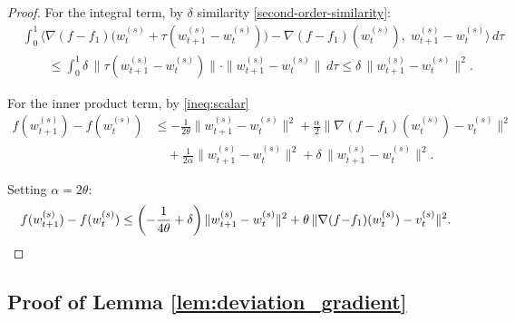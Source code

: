 \documentclass{article}
\begin{document}
\begin{proof}
For the integral term, by $\delta$ similarity \ref{second-order-similarity}:
\begin{align*}
&\int_0^1 \langle \nabla(f{-}f_1)\bigl(w_t^{(s)} 
  + \tau(w_{t+1}^{(s)} - w_t^{(s)})\bigr) 
  - \nabla(f{-}f_1)(w_t^{(s)}),\; 
  w_{t+1}^{(s)} - w_t^{(s)} \rangle \, d\tau \\
&\qquad \leq \int_0^1 \delta\,\|\tau(w_{t+1}^{(s)} - w_t^{(s)})\| 
  \cdot \|w_{t+1}^{(s)} - w_t^{(s)}\| \, d\tau 
\leq \delta\,\|w_{t+1}^{(s)} - w_t^{(s)}\|^2.
\end{align*}

For the inner product term, by \ref{ineq:scalar} 
\begin{align*}
f(w_{t+1}^{(s)}) - f(w_t^{(s)}) 
&\leq -\frac{1}{2\theta}\|w_{t+1}^{(s)} - w_t^{(s)}\|^2 
  + \frac{\alpha}{2}\|\nabla(f{-}f_1)(w_t^{(s)}) - v_t^{(s)}\|^2 \\
&\quad + \frac{1}{2\alpha}\|w_{t+1}^{(s)} - w_t^{(s)}\|^2 
  + \delta\,\|w_{t+1}^{(s)} - w_t^{(s)}\|^2.
\end{align*}

Setting $\alpha = 2\theta$:
\[
f(w_{t+1}^{(s)}) - f(w_t^{(s)}) 
\leq \left(-\frac{1}{4\theta} + \delta\right)\|w_{t+1}^{(s)} - w_t^{(s)}\|^2 
+ \theta\,\|\nabla(f{-}f_1)(w_t^{(s)}) - v_t^{(s)}\|^2. \qedhere
\]
\end{proof}

\subsection{Proof of Lemma \ref{lem:deviation_gradient}}
\end{document}
